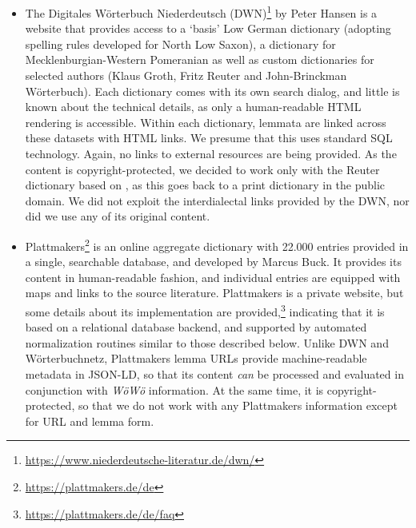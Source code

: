 \begin{itemize}
\item The Digitales Wörterbuch Niederdeutsch (DWN)\footnote{\url{https://www.niederdeutsche-literatur.de/dwn/}} by Peter Hansen is a website that provides access to a `basis' Low German dictionary (adopting spelling rules developed for North Low Saxon), a dictionary for Mecklenburgian-Western Pomeranian as well as custom dictionaries for selected authors (Klaus Groth, Fritz Reuter and John-Brinckman Wörterbuch). Each dictionary comes with its own search dialog, and little is known about the technical details, as only a human-readable HTML rendering is accessible. Within each dictionary, lemmata are linked across these datasets with HTML links. We presume that this uses standard SQL technology. Again, no links to external resources are being provided.
As the content is copyright-protected, we decided to work only with the Reuter dictionary based on \citep{muller1904reuter}, as this goes back to a print dictionary in the public domain. We did not exploit the interdialectal links provided by the DWN, nor did we use any of its original content.
\item Plattmakers\footnote{
    \url{https://plattmakers.de/de}
} is an online aggregate dictionary with 22.000 entries provided in a single, searchable database, and developed by Marcus Buck. It provides its content in human-readable fashion, and individual entries are equipped with maps and links to the source literature. Plattmakers is a private website, but some details about its implementation are provided,\footnote{\url{https://plattmakers.de/de/faq}} indicating that it is based on a relational database backend, and supported by automated normalization routines similar to those described below. Unlike DWN and Wörterbuchnetz, Plattmakers lemma URLs provide machine-readable metadata in JSON-LD, so that its content \emph{can} be processed and evaluated in conjunction with \emph{WöWö} information. At the same time, it is copyright-protected, so that we do not work with any Plattmakers information except for URL and lemma form. %
\end{itemize}

